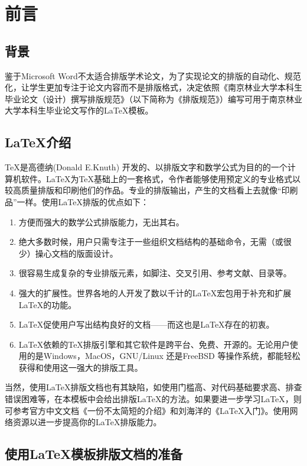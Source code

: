 \documentclass[oneside,zihao=-4]{ctexbook}
\begin{document}

\newpage
{} %
\tableofcontents


\newpage
\setcounter{page}{1}
\chapter{前言}
\section{背景}
鉴于Microsoft Word不太适合排版学术论文，为了实现论文的排版的自动化、规范化，让学生更加专注于论文内容而不是排版格式，决定依照《南京林业大学本科生毕业论文（设计）撰写排版规范》（以下简称为《排版规范》）编写可用于南京林业大学本科生毕业论文写作的\LaTeX{}模板。
\section{\LaTeX{}介绍}
\TeX{}是高德纳(Donald E.Knuth) 开发的、以排版文字和数学公式为目的的一个计算机软件。\LaTeX{}为\TeX{}基础上的一套格式，令作者能够使用预定义的专业格式以较高质量排版和印刷他们的作品。专业的排版输出，产生的文档看上去就像“印刷品”一样。使用\LaTeX{}排版的优点如下：\cite{一份不太简短的LaTeX介绍}\par
\begin{enumerate}
  \item 方便而强大的数学公式排版能力，无出其右。
  \item 绝大多数时候，用户只需专注于一些组织文档结构的基础命令，无需（或很少）操心文档的版面设计。
  \item 很容易生成复杂的专业排版元素，如脚注、交叉引用、参考文献、目录等。
  \item 强大的扩展性。世界各地的人开发了数以千计的\LaTeX{}宏包用于补充和扩展\LaTeX{}的功能。
  \item \LaTeX{}促使用户写出结构良好的文档——而这也是\LaTeX{}存在的初衷。
  \item \LaTeX{}依赖的\TeX{}排版引擎和其它软件是跨平台、免费、开源的。无论用户使用的是Windows，MacOS，GNU/Linux 还是FreeBSD 等操作系统，都能轻松获得和使用这一强大的排版工具。
\end{enumerate}\par
当然，使用\LaTeX{}排版文档也有其缺陷，如使用门槛高、对代码基础要求高、排查错误困难等，在本模板中会给出排版\LaTeX{}的方法。如果要进一步学习\LaTeX{}，则可参考官方中文文档《一份不太简短的\LaTeXe{}介绍》和刘海洋的《\LaTeX{}入门》。使用网络资源以进一步提高你的\LaTeX{}排版能力。
\section{使用\LaTeX{}模板排版文档的准备}
\end{document}
